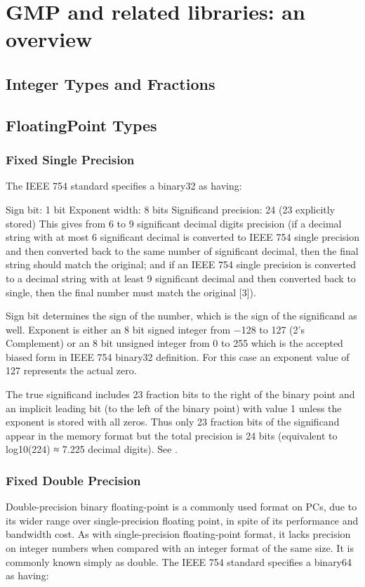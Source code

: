 
\chapter{GMP and related libraries: an overview}




\section{Integer Types and Fractions}

\section{FloatingPoint Types}
\label{FloatingPointTypes}

\subsection{Fixed Single Precision}
The IEEE 754 standard specifies a binary32 as having:

Sign bit: 1 bit
Exponent width: 8 bits
Significand precision: 24 (23 explicitly stored)
This gives from 6 to 9 significant decimal digits precision (if a decimal string with at most 6 significant decimal is converted to IEEE 754 single precision and then converted back to the same number of significant decimal, then the final string should match the original; and if an IEEE 754 single precision is converted to a decimal string with at least 9 significant decimal and then converted back to single, then the final number must match the original [3]).

Sign bit determines the sign of the number, which is the sign of the significand as well. Exponent is either an 8 bit signed integer from −128 to 127 (2's Complement) or an 8 bit unsigned integer from 0 to 255 which is the accepted biased form in IEEE 754 binary32 definition. For this case an exponent value of 127 represents the actual zero.

The true significand includes 23 fraction bits to the right of the binary point and an implicit leading bit (to the left of the binary point) with value 1 unless the exponent is stored with all zeros. Thus only 23 fraction bits of the significand appear in the memory format but the total precision is 24 bits (equivalent to log10(224) ≈ 7.225 decimal digits).  See \cite{Kahan_1997}.


\subsection{Fixed Double Precision}
Double-precision binary floating-point is a commonly used format on PCs, due to its wider range over single-precision floating point, in spite of its performance and bandwidth cost. As with single-precision floating-point format, it lacks precision on integer numbers when compared with an integer format of the same size. It is commonly known simply as double. The IEEE 754 standard specifies a binary64 as having:

